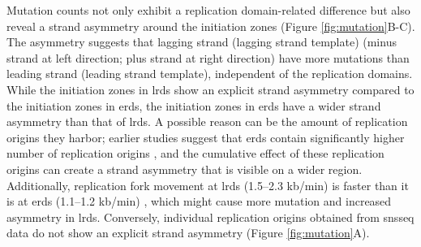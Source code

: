 Mutation counts not only exhibit a replication domain-related difference but also reveal a strand asymmetry around the initiation zones (Figure \ref{fig:mutation}B-C). The asymmetry suggests that lagging strand (lagging strand template) (minus strand at left direction; plus strand at right direction) have more mutations than leading strand (leading strand template), independent of the replication domains. While the initiation zones in \gls{lrd}s show an explicit strand asymmetry compared to the initiation zones in \gls{erd}s, the initiation zones in \gls{erd}s have a wider strand asymmetry than that of \gls{lrd}s. A possible reason can be the amount of replication origins they harbor; earlier studies suggest that \gls{erd}s contain significantly higher number of replication origins \citep{besnard2012unraveling}, and the cumulative effect of these replication origins can create a strand asymmetry that is visible on a wider region. Additionally, replication fork movement at \gls{lrd}s (1.5–2.3 \gls{kb}/min) is faster than it is at \gls{erd}s (1.1–1.2 \gls{kb}/min) \citep{takebayashi2005regulation}, which might cause more mutation and increased asymmetry in \gls{lrd}s. Conversely, individual replication origins obtained from \gls{snsseq} data do not show an explicit strand asymmetry (Figure \ref{fig:mutation}A).

